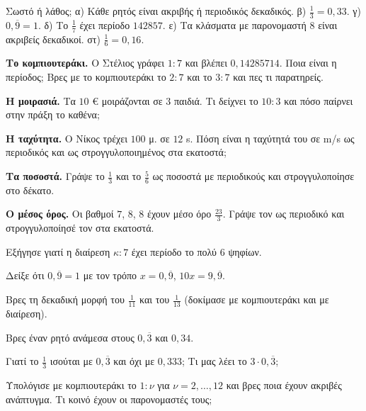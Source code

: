 \ex Σωστό ή λάθος; α) Κάθε ρητός είναι ακριβής ή περιοδικός δεκαδικός. \quad β) $\frac{1}{3}=0{,}33$. \quad γ) $0{,}\overline{9}=1$. \quad δ) Το $\frac{1}{7}$ έχει περίοδο $142857$. \quad ε) Τα κλάσματα με παρονομαστή $8$ είναι ακριβείς δεκαδικοί. \quad στ) $\frac{1}{6}=0{,}16$.


\ex \textbf{Το κομπιουτεράκι.} Ο Στέλιος γράφει $1:7$ και βλέπει $0{,}14285714$. Ποια είναι η περίοδος; Βρες με το κομπιουτεράκι το $2:7$ και το $3:7$ και πες τι παρατηρείς.

\ex \textbf{Η μοιρασιά.} Τα $10$ € μοιράζονται σε $3$ παιδιά. Τι δείχνει το $10:3$ και πόσο παίρνει στην πράξη το καθένα;

\ex \textbf{Η ταχύτητα.} Ο Νίκος τρέχει $100$ μ. σε $12$ s. Πόση είναι η ταχύτητά του σε m/s ως περιοδικός και ως στρογγυλοποιημένος στα εκατοστά;

\ex \textbf{Τα ποσοστά.} Γράψε το $\frac{1}{3}$ και το $\frac{5}{6}$ ως ποσοστά με περιοδικούς και στρογγυλοποίησε στο δέκατο.

\ex \textbf{Ο μέσος όρος.} Οι βαθμοί $7$, $8$, $8$ έχουν μέσο όρο $\frac{23}{3}$. Γράψε τον ως περιοδικό και στρογγυλοποίησέ τον στα εκατοστά.


\ex Εξήγησε γιατί η διαίρεση $\kappa:7$ έχει περίοδο το πολύ $6$ ψηφίων.

\ex Δείξε ότι $0{,}\overline{9}=1$ με τον τρόπο $x=0{,}\overline{9}$, $10x=9{,}\overline{9}$.

\ex Βρες τη δεκαδική μορφή του $\frac{1}{11}$ και του $\frac{1}{13}$ (δοκίμασε με κομπιουτεράκι και με διαίρεση).

\ex Βρες έναν ρητό ανάμεσα στους $0{,}\overline{3}$ και $0{,}34$.

\ex Γιατί το $\frac{1}{3}$ ισούται με $0{,}\overline{3}$ και όχι με $0{,}333$; Τι μας λέει το $3\cdot0{,}\overline{3}$;


\ex Υπολόγισε με κομπιουτεράκι το $1:\nu$ για $\nu=2,\dots,12$ και βρες ποια έχουν ακριβές ανάπτυγμα. Τι κοινό έχουν οι παρονομαστές τους;

